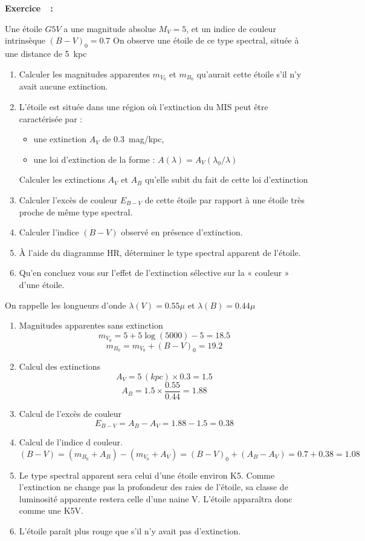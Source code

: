 \documentclass[a4paper,10pt]{report}
\newcounter{noexo}
\newenvironment{Exercise}[1][]{%
  \stepcounter{noexo}
  \medskip\noindent\textbf{Exercice~\thenoexo~:~#1}
  \medskip\par
  \addcontentsline{toc}{subsubsection}{Exercice~\thenoexo~:~#1}
}{}
\begin{document}
\begin{Exercise}
  Une étoile $G5V$ a une magnitude absolue $M_V= 5$, et un indice de
  couleur intrinsèque $(B-V)_0 =0.7$ On observe une étoile de ce type
  spectral, située à une distance de 5~kpc
  \begin{enumerate}
  \item Calculer les magnitudes apparentes $m_{V_0}$ et $m_{B_0}$
    qu'aurait cette étoile s'il n'y avait aucune extinction.
  \item L'étoile est située dans une région où l'extinction du MIS
    peut être caractérisée par :
    \begin{itemize}
    \item une extinction $A_V$ de 0.3~mag/kpc,
    \item une loi d'extinction de la forme : $A(\lambda) = A_V
      (\lambda_0/\lambda)$
    \end{itemize}
    Calculer les extinctions $A_V$ et $A_B$ qu'elle subit du fait de
    cette loi d'extinction
  \item Calculer l'excès de couleur $E_{B-V}$ de cette étoile par
    rapport à une étoile très proche de même type spectral.
  \item Calculer l'indice $(B-V)$ observé en présence d'extinction.
  \item À l'aide du diagramme HR, déterminer le type spectral apparent
    de l'étoile.
  \item Qu'en concluez vous sur l'effet de l'extinction sélective sur
    la « couleur » d'une étoile.
  \end{enumerate}

  On rappelle les longueurs d'onde $\lambda(V)=0.55\mu$ et
  $\lambda(B)=0.44\mu$
\end{Exercise}

\begin{Answer}
  \begin{enumerate}
  \item Magnitudes apparentes sans extinction
    $$
    m_{V_0} = 5 + 5\log(5000) -5 = 18.5
    $$
    $$
    m_{B_0} = m_{V_0} + (B-V)_0 = 19.2
    $$
  \item Calcul des extinctions
    $$
    A_V = 5\,(kpc)\times 0.3=1.5
    $$
    $$
    A_B = 1.5 \times \frac{0.55}{0.44} = 1.88
    $$
  \item Calcul de l'excès de couleur
    $$
    E_{B-V} = A_B-A_V = 1.88 - 1.5 = 0.38
    $$
  \item Calcul de l'indice d couleur.
    $$
    (B-V) = (m_{B_0} +A_B) - (m_{V_0} +A_V) = (B-V)_0 + (A_B- A_V)=0.7 +
    0.38 = 1.08
    $$
  \item Le type spectral apparent sera celui d'une étoile environ
    K5. Comme l'extinction ne change pas la profondeur des raies de
    l'étoile, sa classe de luminosité apparente restera celle d'une
    naine V. L'étoile apparaîtra donc comme une K5V.
  \item L'étoile paraît plus rouge que s'il n'y avait pas d'extinction.
  \end{enumerate}
\end{Answer}
\end{document}
